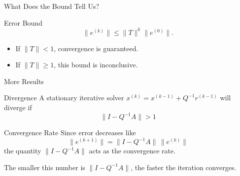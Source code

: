 \documentclass[10pt]{beamer}
\begin{document}
\begin{frame}{What Does the Bound Tell Us?}

\begin{block}{Error Bound}
\[
    \|e^{(k)}\|\le \|T\|^k\|e^{(0)}\|.
\]
\end{block}

\begin{itemize}
    \item If $\|T\|<1$, convergence is guaranteed.

    \bigskip

    \item If $\|T\|\ge1$, this bound is inconclusive.
\end{itemize}


\end{frame}
\begin{frame}{More Results}

    \begin{block}{Divergence}
    A stationary iterative solver $x^{(k)} = x^{(k-1)} + Q^{-1}r^{(k-1)}$ will diverge if 
        $$\|I-Q^{-1}A\|>1$$
    \end{block}

    \begin{block}{Convergence Rate}
    Since error decreases like 
    $$
        \|e^{(k+1)}\| = \|I-Q^{-1}A\|\,\|e^{(k)}\|
    $$
    the quantity $\|I-Q^{-1}A\|$ acts as the convergence rate.
    \end{block}

    \vspace{3mm}
    The smaller this number is $\|I-Q^{-1}A\|$, the faster the iteration converges.
    
\end{frame}
\end{document}
